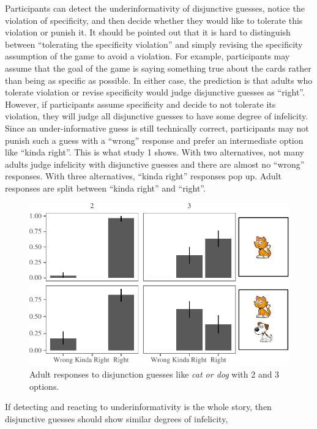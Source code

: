 \documentclass[oneside]{report}
\theoremstyle{definition}
\theoremstyle{definition}
\theoremstyle{definition}
\theoremstyle{remark}
\begin{document}
Participants can detect the underinformativity of disjunctive guesses,
notice the violation of specificity, and then decide whether they would
like to tolerate this violation or punish it. It should be pointed out
that it is hard to distinguish between ``tolerating the specificity
violation'' and simply revising the specificity assumption of the game
to avoid a violation. For example, participants may assume that the goal
of the game is saying something true about the cards rather than being
as specific as possible. In either case, the prediction is that adults
who tolerate violation or revise specificity would judge disjunctive
guesses as ``right''. However, if participants assume specificity and
decide to not tolerate its violation, they will judge all disjunctive
guesses to have some degree of infelicity. Since an under-informative
guess is still technically correct, participants may not punish such a
guess with a ``wrong'' response and prefer an intermediate option like
``kinda right''. This is what study 1 shows. With two alternatives, not
many adults judge infelicity with disjunctive guesses and there are
almost no ``wrong'' responses. With three alternatives, ``kinda right''
responses pop up. Adult responses are split between ``kinda right'' and
``right''.
\begin{figure}[tb]

{\centering \includegraphics{figs/implicaturePlot-1} 

}

\caption{Adult responses to disjunction guesses like \textit{cat or dog} with 2 and 3 options.}\label{fig:implicaturePlot}
\end{figure}
If detecting and reacting to underinformativity is the whole story, then
disjunctive guesses should show similar degrees of infelicity,
\end{document}
